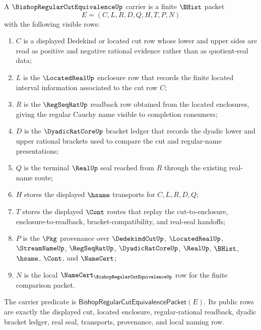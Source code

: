 \begin{definition}
\label{def:bishop-regular-cut-equivalence-carrier}
A $\BishopRegularCutEquivalenceUp$ carrier is a finite $\BHist$ packet
$$
E=(C,L,R,D,Q,H,T,P,N)
$$
with the following visible rows:
\begin{enumerate}
\item $C$ is a displayed Dedekind or located cut row whose lower and upper sides are read as positive and negative rational evidence rather than as quotient-real data;
\item $L$ is the $\LocatedRealUp$ enclosure row that records the finite located interval information associated to the cut row $C$;
\item $R$ is the $\RegSeqRatUp$ readback row obtained from the located enclosures, giving the regular Cauchy name visible to completion consumers;
\item $D$ is the $\DyadicRatCoreUp$ bracket ledger that records the dyadic lower and upper rational brackets used to compare the cut and regular-name presentations;
\item $Q$ is the terminal $\RealUp$ seal reached from $R$ through the existing real-name route;
\item $H$ stores the displayed $\hsame$ transports for $C,L,R,D,Q$;
\item $T$ stores the displayed $\Cont$ routes that replay the cut-to-enclosure, enclosure-to-readback, bracket-compatibility, and real-seal handoffs;
\item $P$ is the $\Pkg$ provenance over $\DedekindCutUp$, $\LocatedRealUp$, $\StreamNameUp$, $\RegSeqRatUp$, $\DyadicRatCoreUp$, $\RealUp$, $\BHist$, $\hsame$, $\Cont$, and $\NameCert$;
\item $N$ is the local $\NameCert_{\BishopRegularCutEquivalenceUp}$ row for the finite comparison packet.
\end{enumerate}
The carrier predicate is $\mathsf{BishopRegularCutEquivalencePacket}(E)$. Its public rows are exactly the displayed cut, located enclosure, regular-rational readback, dyadic bracket ledger, real seal, transports, provenance, and local naming row.
\end{definition}

